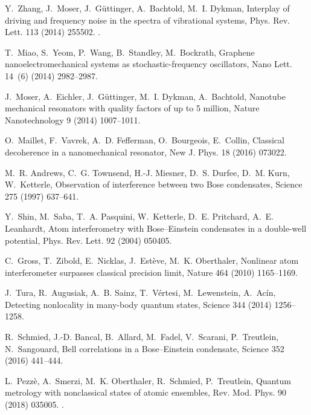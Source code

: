 \documentclass[3p,sort&compress]{elsarticle}
\begin{document}
\begin{thebibliography}{100}
Y.~Zhang, J.~Moser, J.~G\"uttinger, A.~Bachtold, M.~I. Dykman, Interplay of
  driving and frequency noise in the spectra of vibrational systems, Phys. Rev.
  Lett. 113 (2014) 255502.
\newblock \href {http://dx.doi.org/10.1103/PhysRevLett.113.255502}
  {}.

T.~Miao, S.~Yeom, P.~Wang, B.~Standley, M.~Bockrath, Graphene
  nanoelectromechanical systems as stochastic-frequency oscillators, Nano Lett.
  14~(6) (2014) 2982--2987.

J.~Moser, A.~Eichler, J.~G{\"u}ttinger, M.~I. Dykman, A.~Bachtold, Nanotube
  mechanical resonators with quality factors of up to 5 million, Nature
  Nanotechnology 9 (2014) 1007--1011.

O.~Maillet, F.~Vavrek, A.~D. Fefferman, O.~Bourgeois, E.~Collin, Classical
  decoherence in a nanomechanical resonator, New J. Phys. 18 (2016) 073022.

M.~R. Andrews, C.~G. Townsend, H.-J. Miesner, D.~S. Durfee, D.~M. Kurn,
  W.~Ketterle, Observation of interference between two {B}ose condensates,
  Science 275 (1997) 637--641.

Y.~Shin, M.~Saba, T.~A. Pasquini, W.~Ketterle, D.~E. Pritchard, A.~E.
  Leanhardt, Atom interferometry with {B}ose--{E}instein condensates in a
  double-well potential, Phys. Rev. Lett. 92 (2004) 050405.

C.~Gross, T.~Zibold, E.~Nicklas, J.~Est{\`e}ve, M.~K. Oberthaler, Nonlinear
  atom interferometer surpasses classical precision limit, Nature 464 (2010)
  1165--1169.

J.~Tura, R.~Augusiak, A.~B. Sainz, T.~V{\'e}rtesi, M.~Lewenstein, A.~Ac{\'i}n,
  Detecting nonlocality in many-body quantum states, Science 344 (2014)
  1256--1258.

R.~Schmied, J.-D. Bancal, B.~Allard, M.~Fadel, V.~Scarani, P.~Treutlein,
  N.~Sangouard, Bell correlations in a {B}ose--{E}instein condensate, Science
  352 (2016) 441--444.

L.~Pezz\`e, A.~Smerzi, M.~K. Oberthaler, R.~Schmied, P.~Treutlein, Quantum
  metrology with nonclassical states of atomic ensembles, Rev. Mod. Phys. 90
  (2018) 035005.
\newblock \href {http://dx.doi.org/10.1103/RevModPhys.90.035005}
  {}.


\end{thebibliography}
\end{document}

